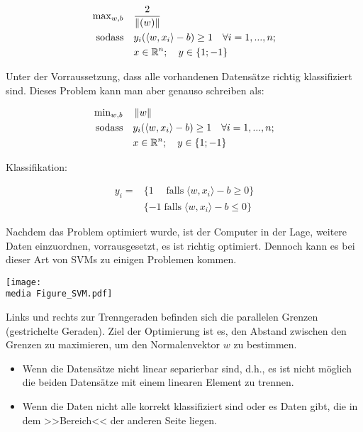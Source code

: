 \begin{align*}
	\operatorname{max}_{w,b} \quad & \frac{2}{\left\lVert(w)\right\rVert} \\
	\operatorname{sodass} \quad &y_{i}(\langle w,x_{i} \rangle -b) \geq 1 \quad \forall  i = 1,...,n ; \\
	&x \in \mathbb{R}^n; \quad	y \in \{1;-1\}
\end{align*}

Unter der Vorraussetzung, dass alle vorhandenen Datensätze richtig klassifiziert sind. Dieses Problem kann 
man aber genauso schreiben als:

\begin{align*}
		\operatorname{min}_{w,b} \quad & \left\lVert w\right\rVert \\
		\operatorname{sodass} \quad &y_{i}(\langle w,x_{i} \rangle -b) \geq 1 \quad \forall i = 1,...,n ; \\
		&x \in \mathbb{R}^n; \quad y \in \{1; -1\}
\end{align*}

Klassifikation:

\begin{align*}
	y_{i} =& \{ 1 \quad \operatorname{falls} \langle w,x_{i} \rangle - b \geq 0\} \\
		& \{ -1 \operatorname{falls} \langle w,x_{i} \rangle - b \leq 0\}
\end{align*}

Nachdem das Problem optimiert wurde, ist der Computer in der Lage, weitere Daten einzuordnen, vorrausgesetzt, es ist richtig optimiert.
Dennoch kann es bei dieser Art von SVMs zu einigen Problemen kommen.\\

\begin{dsafigure}
	\begin{center}
		\texttt{[image: \\media Figure\_SVM.pdf]}
		\caption{Links und rechts zur Trenngeraden befinden sich die parallelen Grenzen (gestrichelte Geraden). Ziel der Optimierung ist es, den Abstand zwischen den Grenzen zu maximieren, um den Normalenvektor $w$ zu bestimmen.}
		\label{SVM2}
	\end{center}
\end{dsafigure}

\begin{itemize}
	\item Wenn die Datensätze nicht linear separierbar sind, d.h., es ist nicht möglich die beiden Datensätze mit einem linearen Element zu trennen.
	
	\item Wenn die Daten nicht alle korrekt klassifiziert sind oder es Daten gibt, die in dem >>Bereich<< der anderen Seite liegen.
\end{itemize}

